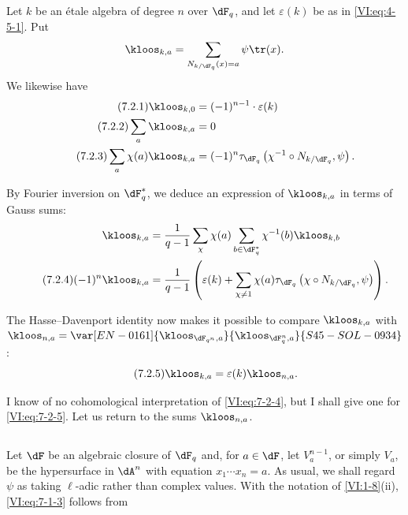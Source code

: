 \subsection{}\label{VI:7-2}

Let $k$ be an étale algebra of degree $n$ over $\dF_q$, and let $\varepsilon(k)$ 
be as in \eqref{VI:eq:4-5-1}. Put 
\[
  \kloos_{k,a} = \sum_{N_{k/\dF_q}(x)=a} \psi \tr(x) \text{.} 
\]
We likewise have 
\begin{align*}\tag{7.2.1}\label{VI:eq:7-2-1}
  \kloos_{k,0} &= (-1)^{n-1} \cdot \varepsilon(k) \\ \tag{7.2.2}\label{VI:eq:7-2-2}
  \sum_a \kloos_{k,a} &= 0 \\ \tag{7.2.3}\label{VI:eq:7-2-3}
  \sum_a \chi(a) \kloos_{k,a} &= (-1)^n \tau_{\dF_q}\left(\chi^{-1}\circ N_{k/\dF_q},\psi\right) \text{.} 
\end{align*}

By Fourier inversion on $\dF_q^\ast$, we deduce an expression of 
$\kloos_{k,a}$ in terms of Gauss sums: 
\begin{align*} 
  \kloos_{k,a} &= \frac{1}{q-1} \sum_\chi \chi(a) \sum_{b\in \dF_q^\ast} \chi^{-1}(b) \kloos_{k,b} \\ \tag{7.2.4}\label{VI:eq:7-2-4}
  (-1)^n \kloos_{k,a} &= \frac{1}{q-1} \left(\varepsilon(k) + \sum_{\chi\ne 1} \chi(a) \tau_{\dF_q}\left(\chi\circ N_{k/\dF_q},\psi\right) \right) \text{.} 
\end{align*}

The Hasse--Davenport identity now makes it possible to compare $\kloos_{k,a}$ 
with $\kloos_{n,a} = \var[EN-0161]{\kloos_{\dF_{q^n},a}}{\kloos_{\dF_q^n,a}}{S45-SOL-0934}$: 
\begin{equation*}\tag{7.2.5}\label{VI:eq:7-2-5}
  \kloos_{k,a} = \varepsilon(k) \kloos_{n,a} \text{.} 
\end{equation*}

I know of no cohomological interpretation of \eqref{VI:eq:7-2-4}, but 
I shall give one for \eqref{VI:eq:7-2-5}. Let us return to the sums $\kloos_{n,a}$. 





\subsection{}\label{VI:7-3}

Let $\dF$ be an algebraic closure of $\dF_q$ and, for $a\in \dF$, let 
$V_a^{n-1}$, or simply $V_a$, be the hypersurface in $\dA^n$ with equation 
$x_1 \dotsm x_n=a$. As usual, we shall regard $\psi$ as taking 
$\ell$-adic rather than complex values. With the notation of 
\ref{VI:1-8}(ii), \eqref{VI:eq:7-1-3} follows from 





